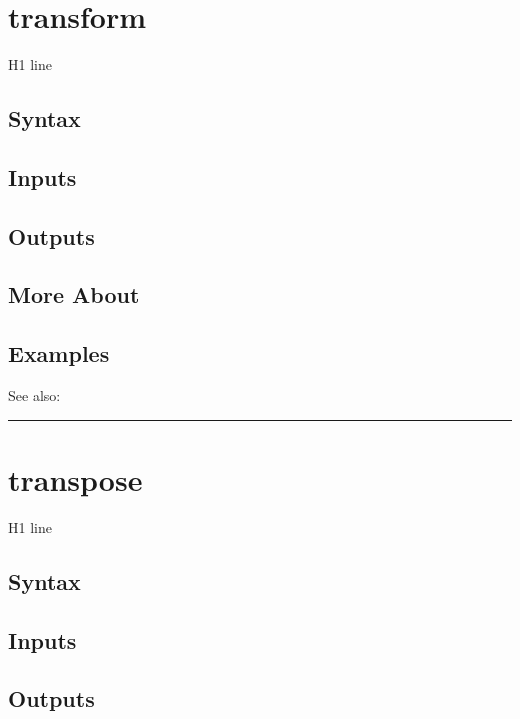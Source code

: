 \documentclass[letterpaper,10pt,english]{sphinxmanual}
\begin{document}
\section{transform}
\label{classes/time_series/@ts/ts:id578}\label{classes/time_series/@ts/ts:transform}
H1 line


\subsection{Syntax}
\label{classes/time_series/@ts/ts:id579}

\subsection{Inputs}
\label{classes/time_series/@ts/ts:id580}

\subsection{Outputs}
\label{classes/time_series/@ts/ts:id581}

\subsection{More About}
\label{classes/time_series/@ts/ts:id582}

\subsection{Examples}
\label{classes/time_series/@ts/ts:id583}
See also:


\bigskip\hrule{}\bigskip



\section{transpose}
\label{classes/time_series/@ts/ts:id584}\label{classes/time_series/@ts/ts:transpose}
H1 line


\subsection{Syntax}
\label{classes/time_series/@ts/ts:id585}

\subsection{Inputs}
\label{classes/time_series/@ts/ts:id586}

\subsection{Outputs}
\label{classes/time_series/@ts/ts:id587}
\end{document}

